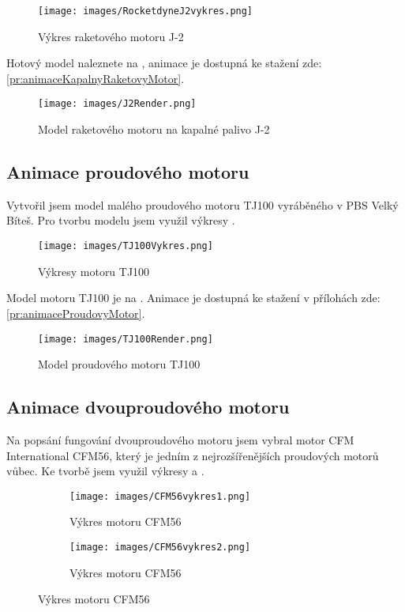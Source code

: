 \begin{figure}[H]
    \centering
    \texttt{[image: images/RocketdyneJ2vykres.png]}
    \caption{Výkres raketového motoru J-2}
    \label{obr:J2vykres}
\end{figure}

{Hotový model naleznete na , animace je dostupná ke stažení zde: \ref{pr:animaceKapalnyRaketovyMotor}.}

\begin{figure}[H]
    \centering
    \texttt{[image: images/J2Render.png]}
    \caption{Model raketového motoru na kapalné palivo J-2 \jaObr}
    \label{obr:J2Render}
\end{figure}

\newpage

\subsection{Animace proudového motoru}
{Vytvořil jsem model malého proudového motoru TJ100 vyráběného v PBS Velký Bíteš. Pro tvorbu modelu jsem využil výkresy .}
\cite{PBS:Minijets}

\begin{figure}[H]
    \centering
    \texttt{[image: images/TJ100Vykres.png]}
    \caption{Výkresy motoru TJ100}
    \label{obr:PBSTJ100Vykres}
\end{figure}

{Model motoru TJ100 je na . Animace je dostupná ke stažení v přílohách zde: \ref{pr:animaceProudovyMotor}.}

\begin{figure}[H]
    \centering
    \texttt{[image: images/TJ100Render.png]}
    \caption{Model proudového motoru TJ100 \jaObr}
    \label{obr:TJ100Render}
\end{figure}

\newpage

\subsection{Animace dvouproudového motoru}
{Na popsání fungování dvouproudového motoru jsem vybral motor CFM International CFM56, který je jedním z nejrozšířenějších proudových motorů vůbec. Ke tvorbě jsem využil výkresy  a .}
\cite{RG:ReducedOrderModel}\cite{TL:OffDesignPerformancePrediction}

\begin{figure}[H]
    \centering
    \begin{subfigure}{.5\textwidth}
        \centering
        \texttt{[image: images/CFM56vykres1.png]}
        \caption{Výkres motoru CFM56}
        \label{obr:CFM56vykres1}
    \end{subfigure}%
    \begin{subfigure}{.5\textwidth}
        \centering
        \texttt{[image: images/CFM56vykres2.png]}
        \caption{Výkres motoru CFM56}
        \label{obr:CFM56vykres2}
    \end{subfigure}
\end{figure}

